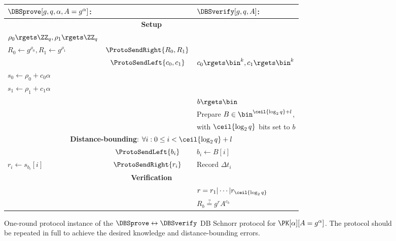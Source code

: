 \begin{figure*}
  \centering
  \begin{tabular}{lcl}
    \(\DBSprove[g, q, \alpha, A = g^\alpha]\):
    & &
    \(\DBSverify[g, q, A]\):
    \\
    \midrule

    \multicolumn{3}{c}{\textbf{Setup}} \\

    \(\rho_0\rgets \ZZ_q, \rho_1\rgets \ZZ_q\)
    &
    &
    \\

    \(R_0\gets g^{\rho_0}, R_1\gets g^{\rho_1}\)
    & \(\ProtoSendRight{R_0, R_1}\)
    &
    \\

    & \(\ProtoSendLeft{c_0, c_1}\)
    & \(c_0\rgets \bin^k, c_1\rgets \bin^k\)
    \\

    \(s_0\gets \rho_0 + c_0\alpha\)
    &
    &
    \\

    \(s_1\gets \rho_1 + c_1\alpha\)
    &
    &
    \\

    &
    & \(b\rgets \bin\)
    \\

    &
    & Prepare \(B\in \bin^{\ceil{\log_2 q}+l}\),
    \\

    &
    & with \(\ceil{\log_2 q}\) bits set to \(b\)
    \\

    \midrule
    \multicolumn{3}{c}{\textbf{Distance-bounding}: \(\forall i: 0\leq i < 
        \ceil{\log_2 q} + l\)} \\


    & \(\ProtoSendLeft{b_i}\)
    & \(b_i\gets B[i]\)
    \\

    \(r_i\gets s_{b_i}[i]\)
    & \(\ProtoSendRight{r_i}\)
    & Record \(\Delta t_i\)
    \\

    \midrule
    \multicolumn{3}{c}{\textbf{Verification}}
    \\

    &
    & \(r = r_1|\dotsb|r_{\ceil{\log_2 q}}\)
    \\

    &
    & \(R_b \stackrel{?}{=} g^r A^{c_b}\)
    \\
    
  \end{tabular}
  \caption{%
    One-round protocol instance of the \(\DBSprove\leftrightarrow \DBSverify\) \ac{DB} Schnorr protocol for \(\PK[\alpha][A = g^\alpha]\).
    The protocol should be repeated in full to achieve the desired knowledge and distance-bounding errors.
  }%
  \label{SchnorrFigure}
\end{figure*}

